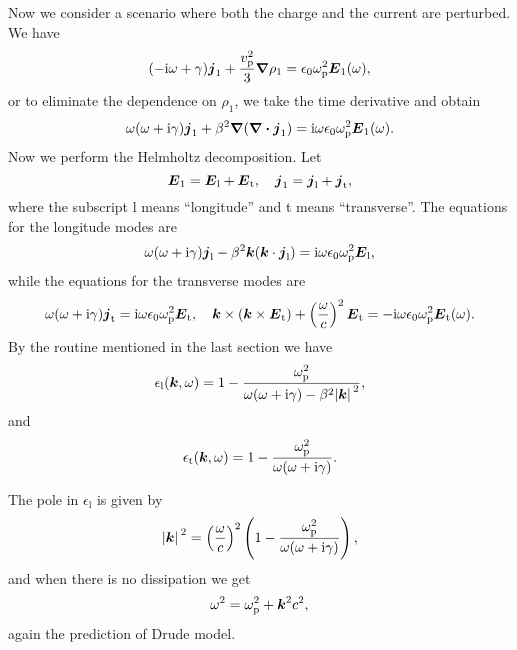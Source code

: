 \documentclass[hyperref, a4paper]{article}
\newcommand*{\ii}{\mathrm{i}}
\begin{document}
Now we consider a scenario where both the charge and the current are perturbed.
We have 
\begin{equation}
    (- \ii \omega + \gamma) \vb*{j}_1 + \frac{v_\text{p}^2}{3} \grad{\rho_1} = \epsilon_0 \omega_\text{p}^2 \vb*{E}_1(\omega),
\end{equation}
or to eliminate the dependence on $\rho_1$, we take the time derivative and obtain
\begin{equation}
    \omega(\omega + \ii \gamma) \vb*{j}_1 + \beta^2 \grad(\div{\vb*{j}_1}) = \ii \omega \epsilon_0 \omega_\text{p}^2 \vb*{E}_1(\omega).
\end{equation}
Now we perform the Helmholtz decomposition. Let 
\begin{equation}
    \vb*{E}_1 = \vb*{E}_\text{l} + \vb*{E}_\text{t}, \quad \vb*{j}_1 = \vb*{j}_\text{l} + \vb*{j}_\text{t},
\end{equation}
where the subscript l means ``longitude'' and t means ``transverse''.
The equations for the longitude modes are 
\begin{equation}
    \omega(\omega + \ii \gamma) \vb*{j}_\text{l} - \beta^2 \vb*{k} (\vb*{k} \cdot \vb*{j}_\text{l}) = \ii \omega \epsilon_0 \omega_\text{p}^2 \vb*{E}_\text{l},
\end{equation}
while the equations for the transverse modes are 
\begin{equation}
    \omega(\omega + \ii \gamma) \vb*{j}_\text{t} = \ii \omega \epsilon_0 \omega_\text{p}^2 \vb*{E}_\text{t}, \quad \vb*{k} \times (\vb*{k} \times \vb*{E}_\text{t}) + \left(\frac{\omega}{c}\right)^2 \vb*{E}_\text{t} = - \ii \omega \epsilon_0 \omega_\text{p}^2 \vb*{E}_\text{t}(\omega).
\end{equation}
By the routine mentioned in the last section we have 
\begin{equation}
    \epsilon_\text{l}(\vb*{k}, \omega) = 1 - \frac{\omega_\text{p}^2}{\omega(\omega + \ii \gamma) - \beta^2 \abs*{\vb*{k}}^2},
\end{equation}
and 
\begin{equation}
    \epsilon_\text{t}(\vb*{k}, \omega) = 1 - \frac{\omega_\text{p}^2}{\omega(\omega + \ii \gamma)}.
\end{equation}

The pole in $\epsilon_\text{l}$ is given by 
\begin{equation}
    \abs*{\vb*{k}}^2 = \left(\frac{\omega}{c}\right)^2 \left( 1 - \frac{\omega_\text{p}^2}{\omega(\omega + \ii \gamma)} \right),
\end{equation}
and when there is no dissipation we get 
\begin{equation}
    \omega^2 = \omega_\text{p}^2 + \vb*{k}^2 c^2,
\end{equation}
again the prediction of Drude model. 
\end{document}
